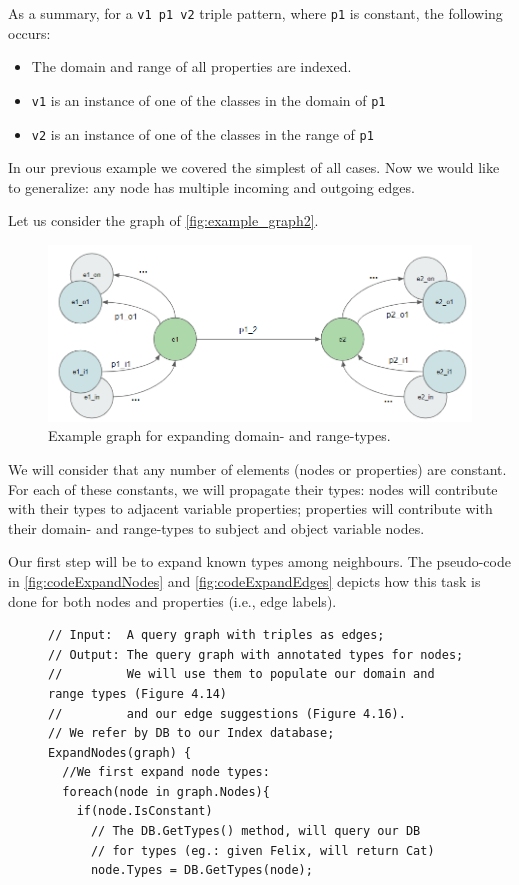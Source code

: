 As a summary, for a \texttt{v1 p1 v2} triple pattern, where \texttt{p1} is constant, the following occurs:
\begin{itemize}
    \item The domain and range of all properties are indexed.
    \item \texttt{v1} is an instance of one of the classes in the domain of \texttt{p1}
    \item \texttt{v2} is an instance of one of the classes in the range of \texttt{p1}
\end{itemize}

In our previous example we covered the simplest of all cases. Now we would like to generalize: any node has multiple incoming and outgoing edges.

\begin{example}

Let us consider the graph of \autoref{fig:example_graph2}. 

\begin{figure}[h]
    \centering
        \includegraphics[width=\linewidth]{imagenes/graph2.png}
        \caption{Example graph for expanding domain- and range-types.}
        \label{fig:example_graph2}
\end{figure}

We will consider that any number of elements (nodes or properties) are constant. For each of these constants, we will propagate their types: nodes will contribute with their types to adjacent variable properties; properties will contribute with their domain- and range-types to subject and object variable nodes.

Our first step will be to expand known types among neighbours. The pseudo-code in \autoref{fig:codeExpandNodes} and \autoref{fig:codeExpandEdges} depicts how this task is done for both nodes and properties (i.e., edge labels).

\begin{figure}[h]
\begin{verbatim}
// Input:  A query graph with triples as edges;
// Output: The query graph with annotated types for nodes;
//         We will use them to populate our domain and range types (Figure 4.14) 
//         and our edge suggestions (Figure 4.16).
// We refer by DB to our Index database;
ExpandNodes(graph) {
  //We first expand node types:
  foreach(node in graph.Nodes){
    if(node.IsConstant)
      // The DB.GetTypes() method, will query our DB
      // for types (eg.: given Felix, will return Cat)
      node.Types = DB.GetTypes(node);


\end{verbatim}
\end{figure}
\end{example}
